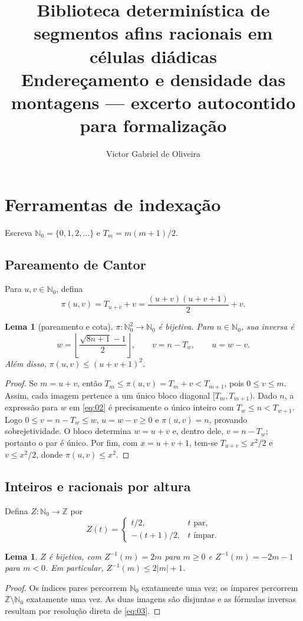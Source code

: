 \documentclass[11pt,a4paper]{article}
\title{Biblioteca determinística de segmentos afins racionais em células diádicas\\
Endereçamento e densidade das montagens — excerto autocontido para formalização}
\author{Victor Gabriel de Oliveira}
\date{}
\theoremstyle{preciso}
\newtheorem{lema}[teorema]{Lema}
\theoremstyle{definition}
\newcommand{\N}{\mathbb N}
\newcommand{\Z}{\mathbb Z}
\newcommand{\eqn}[2]{\begin{equation}\label{eq:#1}#2\end{equation}}
\begin{document}
\maketitle
\setcounter{section}{1}

\section{Ferramentas de indexação}
Escreva $\N_0=\{0,1,2,\ldots\}$ e $T_m=m(m+1)/2$.

\subsection{Pareamento de Cantor}
Para $u,v\in\N_0$, defina
\eqn{01}{\pi(u,v)=T_{u+v}+v=\frac{(u+v)(u+v+1)}2+v.}
\begin{lema}[pareamento e cota]
$\pi:\N_0^2\to\N_0$ é bijetiva. Para $n\in\N_0$, sua inversa é
\eqn{02}{w=\left\lfloor\frac{\sqrt{8n+1}-1}{2}\right\rfloor,\qquad v=n-T_w,\qquad u=w-v.}
Além disso, $\pi(u,v)\le(u+v+1)^2$.
\end{lema}
\begin{proof}
Se $m=u+v$, então $T_m\le\pi(u,v)=T_m+v<T_{m+1}$, pois $0\le v\le m$. Assim, cada imagem pertence a um único bloco diagonal $[T_m,T_{m+1})$. Dado $n$, a expressão para $w$ em \eqref{eq:02} é precisamente o único inteiro com $T_w\le n<T_{w+1}$. Logo $0\le v=n-T_w\le w$, $u=w-v\ge0$ e $\pi(u,v)=n$, provando sobrejetividade. O bloco determina $w=u+v$ e, dentro dele, $v=n-T_w$; portanto o par é único. Por fim, com $x=u+v+1$, tem-se $T_{u+v}\le x^2/2$ e $v\le x^2/2$, donde $\pi(u,v)\le x^2$.
\end{proof}

\subsection{Inteiros e racionais por altura}
Defina $Z:\N_0\to\Z$ por
\eqn{03}{Z(t)=\begin{cases}t/2,&t\text{ par},\\-(t+1)/2,&t\text{ ímpar}.\end{cases}}
\begin{lema}
$Z$ é bijetiva, com $Z^{-1}(m)=2m$ para $m\ge0$ e $Z^{-1}(m)=-2m-1$ para $m<0$. Em particular, $Z^{-1}(m)\le2|m|+1$.
\end{lema}
\begin{proof}
Os índices pares percorrem $\N_0$ exatamente uma vez; os ímpares percorrem $\Z\setminus\N_0$ exatamente uma vez. As duas imagens são disjuntas e as fórmulas inversas resultam por resolução direta de \eqref{eq:03}.
\end{proof}
\end{document}
